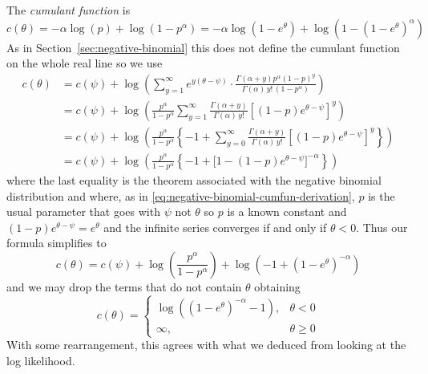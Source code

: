 The \emph{cumulant function} is
$$
   c(\theta)
   =
   - \alpha \log(p) + \log(1 - p^\alpha)
   =
   - \alpha \log(1 - e^\theta) + \log(1 - (1 - e^\theta)^\alpha)
$$
As in Section~\ref{sec:negative-binomial} this does not define the
cumulant function on the whole real line so we use
\begin{align*}
   c(\theta)
   & =
   c(\psi) +
   \log \left( \sum_{y = 1}^\infty
   e^{y (\theta - \psi)} \cdot
   \frac{\Gamma(\alpha + y) p^\alpha (1-p)^y}
   {\Gamma(\alpha) \, y! \, (1 - p^\alpha)}
   \right)
   \\
   & =
   c(\psi) +
   \log \left(
   \frac{p^\alpha}{1 - p^\alpha}
   \sum_{y = 1}^\infty
   \frac{\Gamma(\alpha + y)}{\Gamma(\alpha) \, y!}
   \left[ (1-p) e^{\theta - \psi} \right]^y
   \right)
   \\
   & =
   c(\psi) +
   \log \left(
   \frac{p^\alpha}{1 - p^\alpha}
   \left\{
   - 1 +
   \sum_{y = 0}^\infty
   \frac{\Gamma(\alpha + y)}{\Gamma(\alpha) \, y!}
   \left[ (1-p) e^{\theta - \psi} \right]^y
   \right\}
   \right)
   \\
   & =
   c(\psi) +
   \log \left(
   \frac{p^\alpha}{1 - p^\alpha}
   \left\{
   - 1 +
   \bigl[ 1 - (1-p) e^{\theta - \psi} \bigr]^{- \alpha}
   \right\}
   \right)
\end{align*}
where the last equality is the theorem associated with the negative
binomial distribution \citep{brand-name-distributions}
and where, as in \eqref{eq:negative-binomial-cumfun-derivation}, $p$ is
the usual parameter that goes with $\psi$ not $\theta$ so $p$ is a known
constant and $(1-p) e^{\theta - \psi} = e^\theta$ and the infinite series
converges if and only if $\theta < 0$.
Thus our formula simplifies to
$$
   c(\theta) = c(\psi) + \log\left( \frac{p^\alpha}{1 - p^\alpha} \right)
   +
   \log\left(- 1 + (1 - e^\theta)^{- \alpha} \right)
$$
and we may drop the terms that do not contain $\theta$ obtaining
$$
   c(\theta)
   =
   \begin{cases}
   \log\left((1 - e^\theta)^{- \alpha} - 1\right), & \theta < 0 \\
   \infty, & \theta \ge 0
   \end{cases}
$$
With some rearrangement, this agrees with what we deduced from looking
at the log likelihood.

